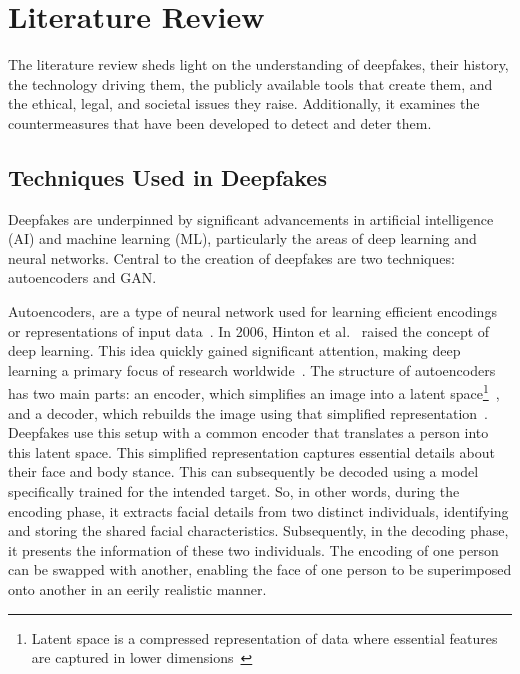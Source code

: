 
\chapter{Literature Review}\label{chapter:literature}
The literature review sheds light on the understanding of deepfakes, their history,
the technology driving them, the publicly available tools that create them, and
the ethical, legal, and societal issues they raise. Additionally, it examines the
countermeasures that have been developed to detect and deter them.

\section{Techniques Used in Deepfakes}\label{chapter:techniques}
Deepfakes are underpinned by significant advancements in artificial intelligence (\ac{AI})
and machine learning (ML), particularly the areas of deep learning and neural
networks. Central to the creation of deepfakes are two techniques:
autoencoders and \ac{GAN}.

Autoencoders, are a type of neural network used for learning
efficient encodings or representations of input data~\cite{doi:10.1126/science.1127647}.
In 2006, Hinton et al.~\cite{10.1145/3297156.3297210,doi:10.1126/science.1127647}
raised the concept of deep learning. This idea quickly gained significant attention,
making deep learning a primary focus of research worldwide~\cite{simonyan2015deep}.
The structure of autoencoders has two main parts: an encoder, which simplifies an
image into a latent space\footnote{Latent space is a compressed representation of data where essential
	features are captured in lower dimensions~\cite{latent-space}}~\cite{latent-space-medium}, and a decoder,
which rebuilds the image using that simplified representation~\cite{latent-space-medium,wikipedia-deepfakes}. Deepfakes use this
setup with a common encoder that translates a person into this latent space. This simplified
representation captures essential details about their face and body stance. This can subsequently
be decoded using a model specifically trained for the intended target. So, in other words,
during the encoding phase, it extracts facial details from two distinct individuals,
identifying and storing the shared facial characteristics. Subsequently, in the decoding phase,
it presents the information of these two individuals. The encoding of one person can be
swapped with another, enabling the face of one person to be superimposed onto another
in an eerily realistic manner.

